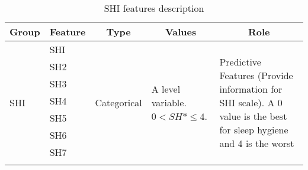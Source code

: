 \documentclass[10pt,letterpaper,oneside]{article}
\begin{document}
\begin{table}[ht]
	\centering
	\caption{SHI features description}
	\label{tab:SHI-feature-description}
	\begin{tabular}{|l|l|l|l|l|}
		\hline
		\multicolumn{1}{|c|}{\textbf{Group}} & \multicolumn{1}{c|}{\textbf{Feature}} & \multicolumn{1}{c|}{\textbf{Type}} & \multicolumn{1}{c|}{\textbf{Values}} & \multicolumn{1}{c|}{\textbf{Role}}   \\ \hline
		\multirow{21}{*}{SHI}  & SHI  & \multirow{21}{*}{Categorical} & \multirow{21}{3cm}{A level variable. $ 0 < SH*\leq 4 $.} & \multirow{21}{5cm}{Predictive Features (Provide information for SHI scale). A 0 value is the best for sleep hygiene and 4 is the worst} \\ \cline{2-2}
		& SH2                                   &                                    &                                                        &                                                                                                                                         \\ \cline{2-2}
		& SH3                                   &                                    &                                                        &                                                                                                                                         \\ \cline{2-2}
		& SH4                                   &                                    &                                                        &                                                                                                                                         \\ \cline{2-2}
		& SH5                                   &                                    &                                                        &                                                                                                                                         \\ \cline{2-2}
		& SH6                                   &                                    &                                                        &                                                                                                                                         \\ \cline{2-2}
		& SH7                                   &                                    &                                                        &                                                                                                                                         \\ \cline{2-2}

\end{tabular}
\end{table}
\end{document}
